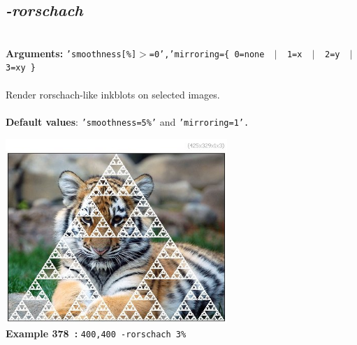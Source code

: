 \documentclass[a4paper,11pt,twoside]{book}
\begin{document}
\subsection{\emph{-rorschach} }\vspace*{-0.5em}
~\\\textbf{Arguments: } 
{\small \texttt{'smoothness[\%]$>$=0','mirroring=\{ 0=none ~$|$~ 1=x ~$|$~ 2=y ~$|$~ 3=xy \}}}\\~\\
Render rorschach-like inkblots on selected images.
~\\~\\\textbf{Default values}: {\small \texttt{'smoothness=5\%'} and \texttt{'mirroring=1'.}}
\begin{center}\includegraphics[keepaspectratio=true,height=7cm,width=\textwidth]{img/gmic_def378.jpg}\\
{\footnotesize \textbf{Example 378~:} \texttt{400,400 -rorschach 3\%}}
\end{center}
\end{document}
